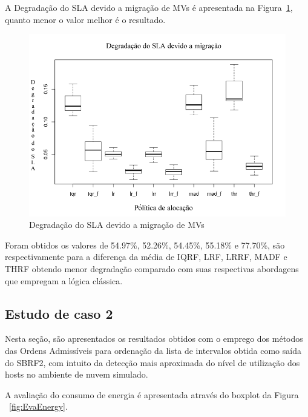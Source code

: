 \documentclass[tcc,capa]{texufpel}
\begin{document}
A Degradação do SLA devido a migração de MVs é apresentada na Figura~\ref{fig:degradacao_sla_migracao}, quanto menor o valor melhor é o resultado.

\begin{figure}[h]
\centering
\includegraphics[scale=0.55]{images/resultados/degradacao_sla_devido_migracao.png} %
\caption{Degradação do SLA devido a migração de MVs}
\label{fig:degradacao_sla_migracao}
\end{figure}

Foram obtidos os valores de 54.97\%, 52.26\%, 54.45\%, 55.18\% e 77.70\%, são respectivamente para a diferença da média de IQRF, LRF, LRRF, MADF e THRF obtendo menor degradação comparado com suas respectivas abordagens que empregam a lógica clássica.

\subsection{Estudo de caso 2}

Nesta seção, são apresentados os resultados obtidos com o emprego dos métodos das Ordens Admissíveis para ordenação da lista de intervalos obtida como saída do SBRF2, com intuito da detecção mais aproximada do nível de utilização dos hosts no ambiente de nuvem simulado.

\newpage

A avaliação do consumo de energia é apresentada através do boxplot da Figura ~\ref{fig:EvaEnergy}.
\end{document}

